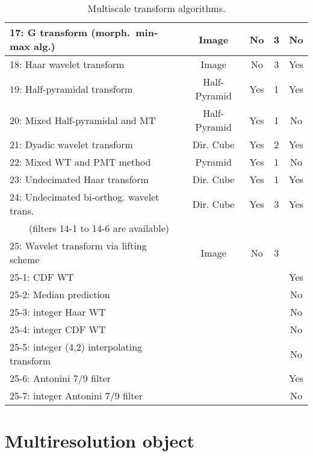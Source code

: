 \begin{table}
{\begin{tabular}{|l|c|c|c|c|}
17: G transform (morph.\ min-max alg.)  & Image & No & 3 & No \\ \hline
18: Haar wavelet transform & Image & No & 3 & Yes \\ \hline
19: Half-pyramidal transform & Half-Pyramid & Yes & 1 & Yes \\ \hline
20: Mixed Half-pyramidal and MT  &  Half-Pyramid & Yes & 1 & No  \\ \hline
21: Dyadic wavelet transform   &  Dir. Cube & Yes & 2 & Yes  \\ \hline
22: Mixed WT and PMT method  & Pyramid & Yes & 1 & No \\ \hline
23: Undecimated Haar transform  & Dir. Cube & Yes & 1 & Yes \\ \hline
24: Undecimated bi-orthog. wavelet trans. & Dir. Cube & Yes & 3 & Yes \\ 
\ \ \ \ (filters 14-1 to 14-6 are available) &           &     &    &  \\ \hline
25: Wavelet transform via lifting scheme & Image & No & 3 &    \\ 
25-1: CDF WT                             &       &    &   &  Yes \\
25-2: Median prediction                  &       &    &   &  No \\
25-3: integer Haar WT                    &       &    &   &  No \\ 
25-4: integer CDF WT                     &       &    &   &  No \\ 
25-5: integer (4,2) interpolating transform &       &    &   &  No \\  
25-6: Antonini 7/9 filter                &       &    &   &  Yes \\  
25-7: integer  Antonini 7/9 filter       &       &    &   &  No \\ \hline
\hline 
\end{tabular}\par}
\caption{Multiscale transform algorithms.}
\label{tab_algo}
\end{table}
\vspace{0.3cm}

\section{Multiresolution object}

